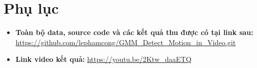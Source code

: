 \documentclass[a4paper]{article}
\begin{document}
\section{Phụ lục}
\begin{itemize}[label={}]
    \item \textbf{Toàn bộ data, source code và các kết quả thu được có tại link sau:} \url{https://github.com/lephamcong/GMM_Detect_Motion_in_Video.git}
    \item \textbf{Link video kết quả: }\url{https://youtu.be/2Ktw_daaETQ}
\end{itemize}
\newpage
\renewcommand*{\bibfont}{\small}
\printbibliography
\end{document}

